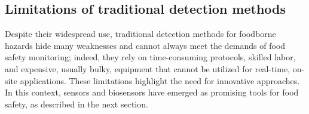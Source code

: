 \subsection{Limitations of traditional detection methods}
\label{sec:limitations_traditional}

Despite their widespread use, traditional detection methods for foodborne hazards hide many weaknesses and cannot always meet the demands of food safety monitoring; indeed, they rely on time-consuming protocols, skilled labor, and expensive, usually bulky, equipment that cannot be utilized for real-time, on-site applications.
These limitations highlight the need for innovative approaches. In this context, sensors and biosensors have emerged as promising tools for food safety, as described in the next section.
